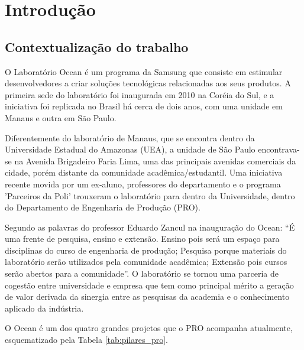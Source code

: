 \chapter[Introdução]{Introdução}
\label{chap:introducao}
\section{Contextualização do trabalho}
\label{cha:contexto}

O Laboratório Ocean é um programa da Samsung que consiste em estimular desenvolvedores a criar soluções tecnológicas relacionadas aos seus produtos. A primeira sede do laboratório foi inaugurada em 2010 na Coréia do Sul, e a iniciativa foi replicada no Brasil há cerca de dois anos, com uma unidade em Manaus e outra em São Paulo.

Diferentemente do laboratório de Manaus, que se encontra dentro da Universidade Estadual do Amazonas (UEA), a unidade de São Paulo encontrava-se na Avenida Brigadeiro Faria Lima, uma das principais avenidas comerciais da cidade, porém distante da comunidade acadêmica/estudantil. Uma iniciativa recente movida por um ex-aluno, professores do departamento e o programa 'Parceiros da Poli' trouxeram o laboratório para dentro da Universidade, dentro do Departamento de Engenharia de Produção (PRO).

Segundo as palavras do professor Eduardo Zancul na inauguração do Ocean: “É uma frente de pesquisa, ensino e extensão. Ensino pois será um espaço para disciplinas do curso de engenharia de produção; Pesquisa porque materiais do laboratório serão utilizados pela comunidade acadêmica; Extensão pois cursos serão abertos para a comunidade”. O laboratório se tornou uma parceria de cogestão entre universidade e empresa que tem como principal mérito a geração de valor derivada da sinergia entre as pesquisas da academia e o conhecimento aplicado da indústria. 

O Ocean é um dos quatro grandes projetos que o PRO acompanha atualmente, esquematizado pela Tabela \ref{tab:pilares_pro}.


